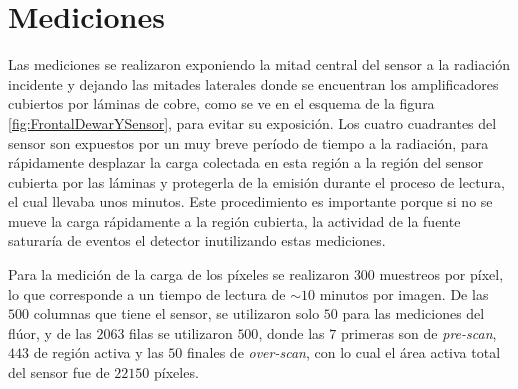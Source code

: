 \section{Mediciones}
\noindent Las mediciones se realizaron exponiendo la mitad central del sensor a la radiación incidente y dejando las mitades laterales donde se encuentran los amplificadores cubiertos por láminas de cobre, como se ve en el esquema de la figura \ref{fig:FrontalDewarYSensor}, para evitar su exposición. Los cuatro cuadrantes del sensor son expuestos por un muy breve período de tiempo a la radiación, para rápidamente desplazar la carga colectada en esta región a la región del sensor cubierta por las láminas y protegerla de la emisión durante el proceso de lectura, el cual llevaba unos minutos. Este procedimiento es importante porque si no se mueve la carga rápidamente a la región cubierta, la actividad de la fuente saturaría de eventos el detector inutilizando estas mediciones.


Para la medición de la carga de los píxeles se realizaron $300$ muestreos por píxel, lo que corresponde a un tiempo de lectura de $\sim 10$ minutos por imagen. De las $500$ columnas que tiene el sensor, se utilizaron solo $50$ para las mediciones del flúor, y de las $2063$ filas se utilizaron $500$, donde las $7$ primeras son de \textit{pre-scan}, $443$ de región activa y las $50$ finales de \textit{over-scan}, con lo cual el área activa total del sensor fue de $22150$ píxeles.

